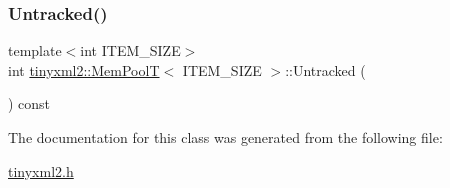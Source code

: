 \subsubsection{\texorpdfstring{Untracked()}{Untracked()}}
{\footnotesize\ttfamily template$<$int I\+T\+E\+M\+\_\+\+S\+I\+ZE$>$ \\
int \mbox{\hyperlink{classtinyxml2_1_1_mem_pool_t}{tinyxml2\+::\+Mem\+PoolT}}$<$ I\+T\+E\+M\+\_\+\+S\+I\+ZE $>$\+::Untracked (\begin{DoxyParamCaption}{ }\end{DoxyParamCaption}) const\hspace{0.3cm}{\ttfamily [inline]}}



The documentation for this class was generated from the following file\+:\begin{DoxyCompactItemize}
\item 
\mbox{\hyperlink{tinyxml2_8h}{tinyxml2.\+h}}\end{DoxyCompactItemize}
